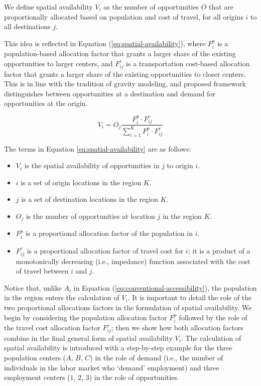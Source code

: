 \documentclass[]{elsarticle} %
\providecommand{\tightlist}{%
  \setlength{\itemsep}{0pt}\setlength{\parskip}{0pt}}
\begin{document}
We define spatial availability \(V_{i}\) as the number of opportunities
\(O\) that are proportionally allocated based on population and cost of
travel, for all origins \(i\) to all destinations \(j\).

This idea is reflected in Equation (\ref{eq:spatial-availability}),
where \(F^p_{i}\) is a population-based allocation factor that grants a
larger share of the existing opportunities to larger centers, and
\(F^c_{ij}\) is a transportation cost-based allocation factor that
grants a larger share of the existing opportunities to closer centers.
This is in line with the tradition of gravity modeling, and proposed
framework distinguishes between opportunities at a destination and
demand for opportunities at the origin.

\begin{equation}
\label{eq:spatial-availability}
V_{i} = O_j\frac{F^p_{i} \cdot F^c_{ij}}{\sum_{i=1}^K F^p_{i} \cdot F^c_{ij}}
\end{equation}

The terms in Equation \ref{eq:spatial-availability} are as follows:

\begin{itemize}
\tightlist
\item
  \(V_{i}\) is the spatial availability of opportunities in \(j\) to
  origin \(i\).
\item
  \(i\) is a set of origin locations in the region \(K\).
\item
  \(j\) is a set of destination locations in the region \(K\).
\item
  \(O_j\) is the number of opportunities at location \(j\) in the region
  \(K\).
\item
  \(F^p_{i}\) is a proportional allocation factor of the population in
  \(i\).
\item
  \(F^c_{ij}\) is a proportional allocation factor of travel cost for
  \(i\); it is a product of a monotonically decreasing (i.e., impedance)
  function associated with the cost of travel between \(i\) and \(j\).
\end{itemize}

Notice that, unlike \(A_i\) in Equation
(\ref{eq:conventional-accessibility}), the population in the region
enters the calculation of \(V_{i}\). It is important to detail the role
of the two proportional allocations factors in the formulation of
spatial availability. We begin by considering the population allocation
factor \(F^p_{i}\) followed by the role of the travel cost allocation
factor \(F^c_{ij}\); then we show how both allocation factors combine in
the final general form of spatial availability \(V_{i}\). The
calculation of spatial availability is introduced with a step-by-step
example for the three population centers (\(A\), \(B\), \(C\)) in the
role of demand (i.e., the number of individuals in the labor market who
`demand' employment) and three employment centers (\(1\), \(2\), \(3\))
in the role of opportunities.
\end{document}
